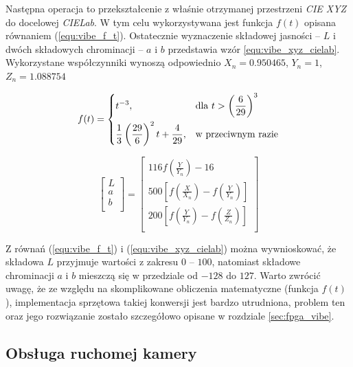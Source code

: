 Następna operacja to przekształcenie z właśnie otrzymanej przestrzeni \textit{CIE XYZ} do docelowej \textit{CIELab}. 
W tym celu wykorzystywana jest funkcja $f(t)$ opisana równaniem (\ref{equ:vibe_f_t}). 
Ostatecznie wyznaczenie składowej jasności -- $L$ i dwóch składowych chrominacji -- $a$ i $b$ przedstawia wzór \ref{equ:vibe_xyz_cielab}. Wykorzystane współczynniki wynoszą odpowiednio $X_n = 0.950465$, $Y_n = 1$, $Z_n = 1.088754$

	\begin{equation}
	    f(t) = 
		\begin{dcases}
    		t^{-3}, & \text{dla } t > \left( \frac{6}{29} \right)^3 \\
    		\frac{1}{3} \left( \frac{29}{6} \right)^2 t + \frac{4}{29}, 
    		& \text{w przeciwnym razie} 
		\end{dcases}
	\label{equ:vibe_f_t}	
	\end{equation}


	\begin{equation}
		\begin{bmatrix}
			L \\
			a \\
			b \\
		\end{bmatrix}
		=
		\begin{bmatrix}
			116 f(\frac{Y}{Y_n}) - 16 \\
			500 \left[ f(\frac{X}{X_n}) - f(\frac{Y}{Y_n}) \right]\\
			200 \left[ f(\frac{Y}{Y_n}) - f(\frac{Z}{Z_n}) \right] \\
		\end{bmatrix}
	\label{equ:vibe_xyz_cielab}
	\end{equation}

Z równań (\ref{equ:vibe_f_t}) i (\ref{equ:vibe_xyz_cielab}) można wywnioskować, że składowa $L$ przyjmuje wartości z zakresu $0$ -- $100$, natomiast składowe chrominacji $a$ i $b$ mieszczą się w przedziale od $-128$ do $127$. 
Warto zwrócić uwagę, że ze względu na skomplikowane obliczenia matematyczne (funkcja $f(t)$), implementacja sprzętowa takiej konwersji jest bardzo utrudniona, problem ten oraz jego rozwiązanie zostało szczegółowo opisane w rozdziale \ref{sec:fpga_vibe}.

\subsection{Obsługa ruchomej kamery}
\label{subsec:vibe_ruchoma_kamera}


